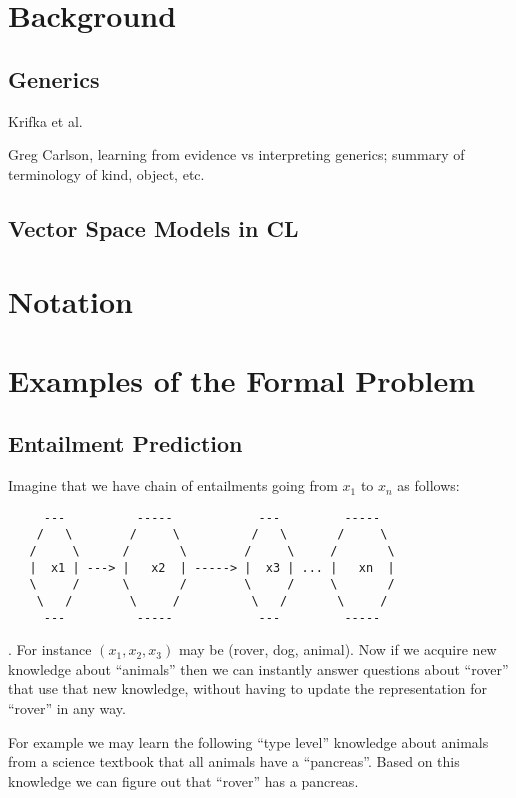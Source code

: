 \documentclass[11pt]{article}
\begin{document}
\section{Background}

\subsection{Generics}
Krifka et al.

Greg Carlson, learning from evidence vs interpreting generics; summary of terminology of kind, object, etc.

\subsection{Vector Space Models in CL}

\section{Notation}


\section{Examples of the Formal Problem}
\label{sec:exampl-form-probl}


\subsection{Entailment Prediction}
\label{subsec:entailment}
Imagine that we have chain of entailments going from $x_1$ to $x_n$ as follows:

\begin{verbatim}
     ---          -----            ---         -----
    /   \        /     \          /   \       /     \
   /     \      /       \        /     \     /       \
   |  x1 | ---> |   x2  | -----> |  x3 | ... |   xn  |
   \     /      \       /        \     /     \       /
    \   /        \     /          \   /       \     /
     ---          -----            ---         -----
\end{verbatim}
               .
For instance $(x_1, x_2, x_3)$ may be (rover, dog, animal). Now if we
acquire new knowledge about ``animals'' then we can instantly answer
questions about ``rover'' that use that new knowledge, without having
to update the representation for ``rover'' in any way.

For example we may learn the following ``type level'' knowledge about
animals from a science textbook that all animals have a
``pancreas''. Based on this knowledge we can figure out that ``rover''
has a pancreas.
\end{document}

